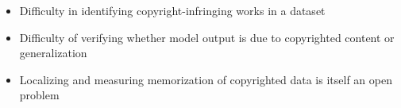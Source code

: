 \begin{tcolorbox}[colback=red!10,colframe=black!50,title=Open Problems]
\begin{itemize}[leftmargin=0pt]
    \item Difficulty in identifying copyright-infringing works in a dataset 
    \item Difficulty of verifying whether model output is due to copyrighted content or generalization 
        \item Localizing and measuring memorization of copyrighted data is itself an open problem
\end{itemize}
\end{tcolorbox}

 
